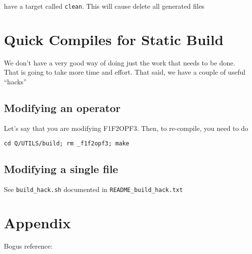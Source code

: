 \item have a target called {\tt clean}. This will cause delete all generated
files
\ee

\section{Quick Compiles for Static Build}

We don't have a very good way of doing just the work that needs to be done. That
is going to take more time and effort. That said, we have a couple of useful
``hacks''
\subsection{Modifying an operator}
Let's say that you are modifying F1F2OPF3. Then, to re-compile, you need to do 
\begin{verbatim}
cd Q/UTILS/build; rm _f1f2opf3; make 
\end{verbatim}

\subsection{Modifying a single file}
See \verb+build_hack.sh+ documented in \verb+README_build_hack.txt+

\section{Appendix}

Bogus reference: \cite{sarawagi99}

 





